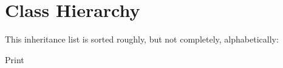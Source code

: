 \section{Class Hierarchy}
This inheritance list is sorted roughly, but not completely, alphabetically\+:\begin{DoxyCompactList}
\item {}
\item Print\begin{DoxyCompactList}
\item {}
\end{DoxyCompactList}
\item {}
\item {}
\end{DoxyCompactList}
